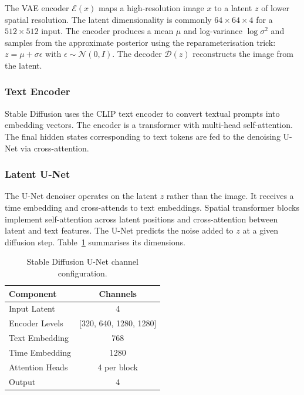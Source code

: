 The VAE encoder $\mathcal{E}(x)$ maps a high-resolution image $x$ to a
latent $z$ of lower spatial resolution.  The latent dimensionality is
commonly $64\times 64\times 4$ for a $512\times 512$ input.  The
encoder produces a mean $\mu$ and log-variance $\log\sigma^2$ and
samples from the approximate posterior using the reparameterisation
trick: $z=\mu + \sigma\epsilon$ with $\epsilon\sim\mathcal{N}(0,I)$.
The decoder $\mathcal{D}(z)$ reconstructs the image from the latent.

\subsubsection{Text Encoder}

Stable Diffusion uses the CLIP text encoder to convert textual
prompts into embedding vectors.  The encoder is a transformer with
multi-head self-attention.  The final hidden states corresponding to
text tokens are fed to the denoising U-Net via cross-attention.

\subsubsection{Latent U-Net}

The U-Net denoiser operates on the latent $z$ rather than the image.
It receives a time embedding and cross-attends to text embeddings.
Spatial transformer blocks implement self-attention across latent
positions and cross-attention between latent and text features.  The
U-Net predicts the noise added to $z$ at a given diffusion
step.  Table~\ref{tab:stabledim} summarises its dimensions.

\begin{table}[H]
  \centering
  \begin{tabular}{lc}
    \toprule
    Component & Channels \\
    \midrule
    Input Latent & 4 \\
    Encoder Levels & [320, 640, 1280, 1280] \\
    Text Embedding & 768 \\
    Time Embedding & 1280 \\
    Attention Heads & 4 per block \\
    Output & 4 \\
    \bottomrule
  \end{tabular}
  \caption{Stable Diffusion U-Net channel configuration.}
  \label{tab:stabledim}
\end{table}

